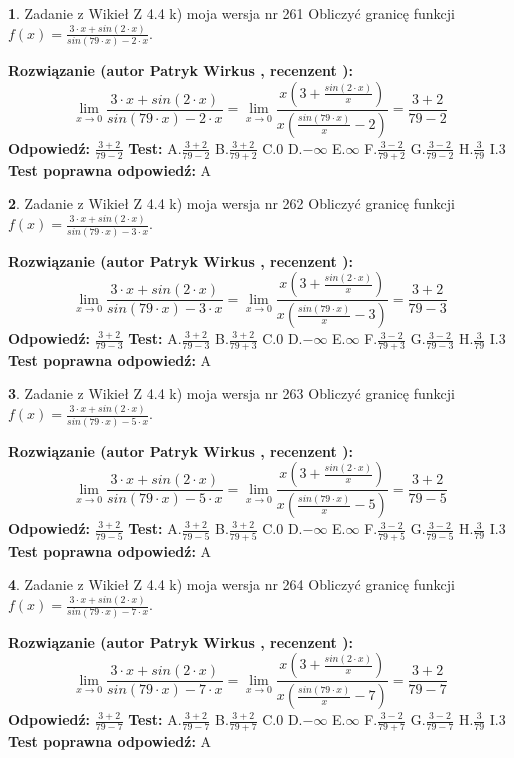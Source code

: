 \documentclass[12pt, a4paper]{article}
\theoremstyle{definition} %
\newtheorem{zad}{}
\newcommand{\zadStart}[1]{\begin{zad}#1\newline}
\newcommand{\zadStop}{\end{zad}}
\newcommand{\rozwStart}[2]{\noindent \textbf{Rozwiązanie (autor #1 , recenzent #2): }\newline}
\newcommand{\rozwStop}{\newline}
\newcommand{\odpStart}{\noindent \textbf{Odpowiedź:}\newline}
\newcommand{\odpStop}{\newline}
\newcommand{\testStart}{\noindent \textbf{Test:}\newline}
\newcommand{\testStop}{\newline}
\newcommand{\kluczStart}{\noindent \textbf{Test poprawna odpowiedź:}\newline}
\newcommand{\kluczStop}{\newline}
\begin{document}
\zadStart{Zadanie z Wikieł Z 4.4 k) moja wersja nr 261}
Obliczyć granicę funkcji $f(x)=\frac{3\cdot x +sin(2\cdot x)}{sin(79\cdot x) -2\cdot x}$.
\zadStop
\rozwStart{Patryk Wirkus}{}
$$\lim\limits_{x\to 0}\frac{3\cdot x +sin(2\cdot x)}{sin(79\cdot x) -2\cdot x}
=\lim\limits_{x\to 0}\frac{x(3+\frac{sin(2\cdot x)}{x})}{x(\frac{sin(79\cdot x)}{x}-2)}
=\frac{3+2}{79-2}$$
\rozwStop
\odpStart
$\frac{3+2}{79-2}$
\odpStop
\testStart
A.$\frac{3+2}{79-2}$
B.$\frac{3+2}{79+2}$
C.$0$
D.$-\infty$
E.$\infty$
F.$\frac{3-2}{79+2}$
G.$\frac{3-2}{79-2}$
H.$\frac{3}{79}$
I.$3$
\testStop
\kluczStart
A
\kluczStop



\zadStart{Zadanie z Wikieł Z 4.4 k) moja wersja nr 262}
Obliczyć granicę funkcji $f(x)=\frac{3\cdot x +sin(2\cdot x)}{sin(79\cdot x) -3\cdot x}$.
\zadStop
\rozwStart{Patryk Wirkus}{}
$$\lim\limits_{x\to 0}\frac{3\cdot x +sin(2\cdot x)}{sin(79\cdot x) -3\cdot x}
=\lim\limits_{x\to 0}\frac{x(3+\frac{sin(2\cdot x)}{x})}{x(\frac{sin(79\cdot x)}{x}-3)}
=\frac{3+2}{79-3}$$
\rozwStop
\odpStart
$\frac{3+2}{79-3}$
\odpStop
\testStart
A.$\frac{3+2}{79-3}$
B.$\frac{3+2}{79+3}$
C.$0$
D.$-\infty$
E.$\infty$
F.$\frac{3-2}{79+3}$
G.$\frac{3-2}{79-3}$
H.$\frac{3}{79}$
I.$3$
\testStop
\kluczStart
A
\kluczStop



\zadStart{Zadanie z Wikieł Z 4.4 k) moja wersja nr 263}
Obliczyć granicę funkcji $f(x)=\frac{3\cdot x +sin(2\cdot x)}{sin(79\cdot x) -5\cdot x}$.
\zadStop
\rozwStart{Patryk Wirkus}{}
$$\lim\limits_{x\to 0}\frac{3\cdot x +sin(2\cdot x)}{sin(79\cdot x) -5\cdot x}
=\lim\limits_{x\to 0}\frac{x(3+\frac{sin(2\cdot x)}{x})}{x(\frac{sin(79\cdot x)}{x}-5)}
=\frac{3+2}{79-5}$$
\rozwStop
\odpStart
$\frac{3+2}{79-5}$
\odpStop
\testStart
A.$\frac{3+2}{79-5}$
B.$\frac{3+2}{79+5}$
C.$0$
D.$-\infty$
E.$\infty$
F.$\frac{3-2}{79+5}$
G.$\frac{3-2}{79-5}$
H.$\frac{3}{79}$
I.$3$
\testStop
\kluczStart
A
\kluczStop



\zadStart{Zadanie z Wikieł Z 4.4 k) moja wersja nr 264}
Obliczyć granicę funkcji $f(x)=\frac{3\cdot x +sin(2\cdot x)}{sin(79\cdot x) -7\cdot x}$.
\zadStop
\rozwStart{Patryk Wirkus}{}
$$\lim\limits_{x\to 0}\frac{3\cdot x +sin(2\cdot x)}{sin(79\cdot x) -7\cdot x}
=\lim\limits_{x\to 0}\frac{x(3+\frac{sin(2\cdot x)}{x})}{x(\frac{sin(79\cdot x)}{x}-7)}
=\frac{3+2}{79-7}$$
\rozwStop
\odpStart
$\frac{3+2}{79-7}$
\odpStop
\testStart
A.$\frac{3+2}{79-7}$
B.$\frac{3+2}{79+7}$
C.$0$
D.$-\infty$
E.$\infty$
F.$\frac{3-2}{79+7}$
G.$\frac{3-2}{79-7}$
H.$\frac{3}{79}$
I.$3$
\testStop
\kluczStart
A
\kluczStop
\end{document}
